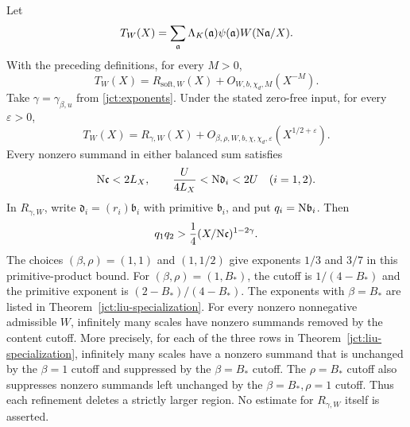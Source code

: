 \begin{theorem}
\label{jct:balanced-theorem}
Let
\[
 T_W(X)=\sum_{\mathfrak a}\Lambda_K(\mathfrak a)\psi(\mathfrak a)
                                  W(\mathrm N\mathfrak a/X).
\]
With the preceding definitions, for every \(M>0\),
\begin{equation}
 T_W(X)=R_{\mathrm{soft},W}(X)+O_{W,b,\chi_d,M}(X^{-M}).
 \label{jct:soft-main}
\end{equation}
Take \(\gamma=\gamma_{\beta,u}\) from \eqref{jct:exponents}.
Under the stated zero-free input, for every \(\varepsilon>0\),
\begin{equation}
 T_W(X)=R_{\gamma,W}(X)+O_{\beta,\rho,W,b,\chi,\chi_d,\varepsilon}
                                      (X^{1/2+\varepsilon}).
 \label{jct:joint-main}
\end{equation}
Every nonzero summand in either balanced sum satisfies
\begin{equation}
 \mathrm N\mathfrak c<2L_X,\qquad
 \frac{U}{4L_X}<\mathrm N\mathfrak d_i<2U\quad(i=1,2).
 \label{jct:balanced-support}
\end{equation}
In \(R_{\gamma,W}\), write
\(\mathfrak d_i=(r_i)\mathfrak b_i\) with primitive
\(\mathfrak b_i\), and put \(q_i=\mathrm N\mathfrak b_i\).
Then
\begin{equation}
 q_1q_2>\frac14(X/\mathrm N\mathfrak c)^{1-2\gamma}.
 \label{jct:primitive-threshold}
\end{equation}
The choices \((\beta,\rho)=(1,1)\) and \((1,1/2)\) give
exponents \(1/3\) and \(3/7\) in this primitive-product bound.
For \((\beta,\rho)=(1,B_*)\), the cutoff is \(1/(4-B_*)\)
and the primitive exponent is \((2-B_*)/(4-B_*)\).
The exponents with \(\beta=B_*\) are
listed in Theorem~\ref{jct:liu-specialization}. For every nonzero
nonnegative admissible \(W\), infinitely many scales have nonzero
summands removed by the content cutoff. More precisely, for each
of the three rows in Theorem~\ref{jct:liu-specialization}, infinitely
many scales have a nonzero
summand that is unchanged by the \(\beta=1\) cutoff and suppressed
by the \(\beta=B_*\) cutoff. The \(\rho=B_*\) cutoff also suppresses
nonzero summands left unchanged by the \(\beta=B_*,\rho=1\)
cutoff. Thus each refinement deletes a strictly larger region.
No estimate for \(R_{\gamma,W}\) itself
is asserted.
\end{theorem}


